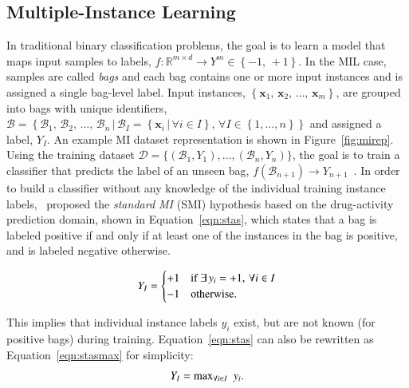 \documentclass[preprint,12pt]{elsarticle}
\newcommand{\set}[1]{{\left\{#1\right\}}}
\newcommand{\st}{{\,|\,}}
\newcommand{\reals}{{\mathbb R}}
\begin{document}
\subsection{Multiple-Instance Learning}\label{subsec:mil}
\begin{sloppypar}
In traditional binary classification problems, the goal is to learn a model that maps input samples to labels, $f: \reals^{m \times d} \rightarrow Y^m \in \set{-1,\,+1}$. In the MIL case, samples are called \textit{bags} and each bag contains one or more input instances and is assigned a single bag-level label. Input instances, $\set{\bm x_1,\, \bm x_2,\, \ldots,\, \bm x_m}$, are grouped into bags with unique identifiers, $\mathcal{B} = \set{\mathcal{B}_1,\, \mathcal{B}_2,\, \ldots,\, \mathcal{B}_n \st \mathcal{B}_I = \set{\bm x_i \st \forall i \in I},\, \forall I \in \set{1, \ldots, n}}$ and assigned a label, $Y_I$. An example MI dataset representation is shown in Figure~\ref{fig:mirep}. Using the training dataset $\mathcal{D} = \{(\mathcal{B}_1,Y_1), \ldots, (\mathcal{B}_n,Y_n)\}$, the goal is to train a classifier that predicts the label of an unseen bag, $f(\mathcal{B}_{n+1}) \rightarrow Y_{n+1}$~\citep{Amores2013}. In order to build a classifier without any knowledge of the individual training instance labels,~\citet{Dietterich1997} proposed the \textit{standard MI} (SMI) hypothesis based on the drug-activity prediction domain, shown in Equation~\eqref{eqn:stas}, which states that a bag is labeled positive if and only if at least one of the instances in the bag is positive, and is labeled negative otherwise.
\end{sloppypar}
\begin{equation}
\centering \label{eqn:stas}
 Y_I = \begin{cases}
			+1 & \text{if }\exists\, y_i = +1,\, \forall i \in I \\
			-1 & \text{otherwise}.
		  \end{cases}
\end{equation}

This implies that individual instance labels $y_i$ exist, but are not known (for positive bags) during training. Equation~\eqref{eqn:stas} can also be rewritten as Equation~\eqref{eqn:stasmax} for simplicity:
\begin{equation}
\centering \label{eqn:stasmax}
Y_I = \text{max}_{\forall i \in I}\,\,\, y_i.
\end{equation}
\end{document}
